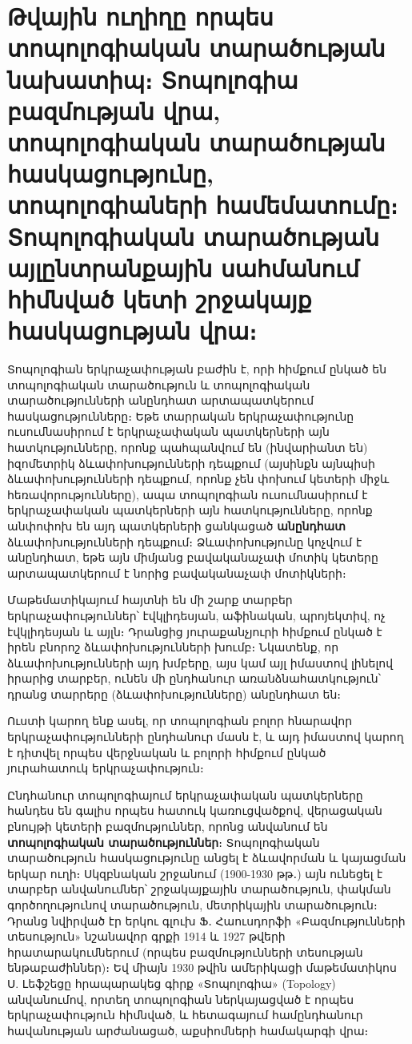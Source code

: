\documentclass[./main.tex]{subfiles}
\begin{document}
\onehalfspacing

\section{Թվային ուղիղը որպես տոպոլոգիական տարածության նախատիպ։ Տո\-պոլոգիա բազմության վրա, տոպոլոգիական տարածության հասկացությունը, տոպոլոգիաների համեմատումը։ Տոպոլոգիական տարածության այլընտրան\-քա\-յին սահ\-մանում հիմնված կետի շրջակայք հասկացության վրա։}\label{sec:4}

\par Տոպոլոգիան երկրաչափության բաժին է, որի հիմքում ընկած են տոպոլոգիա\-կան տարածություն և տոպոլոգիական տարածությունների անընդհատ արտա\-պատ\-կե\-րում հասկացությունները։ Եթե տարրական երկրաչափությունը ուսումնասիրում է երկ\-րա\-չա\-փական պատկերների այն հատկությունները, որոնք պահպանվում են \linebreak (ին\-վարիանտ են) իզոմետրիկ  ձևափոխությունների դեպքում (այսինքն այնպիսի ձևափոխությունների դեպքում, որոնք չեն փոխում կետերի միջև հեռավորություն\-նե\-րը), ապա տոպոլոգիան ուսումնասիրում է երկրաչափական պատկերների այն հատ\-կու\-թյունները, որոնք անփոփոխ են այդ պատկերների ցանկացած \textbf{անընդհատ} ձևափո\-խու\-թյունների դեպքում։ Ձևափոխությունը կոչվում է անընդհատ, եթե այն միմյանց բավականա\-չափ մոտիկ կետերը արտապատկերում է նորից բավականա\-չափ մոտիկների։

\par Մաթեմատիկայում հայտնի են մի շարք տարբեր երկրաչափություններ՝ էվկ\-լի\-դեսյան, աֆինական, պրոյեկտիվ, ոչ էվկլիդեսյան և այլն։ Դրանցից յուրաքանչյուրի հիմքում ընկած է իրեն բնորոշ ձևափոխությունների խումբ։ Նկատենք, որ ձևափո\-խու\-թյունների այդ խմբերը, այս կամ այլ իմաստով լինելով իրարից տարբեր, ունեն մի ընդհանուր առանձնահատկություն՝ դրանց տար\-րերը (ձևափոխութ\-յունները) \linebreak անընդհատ են։

\par Ուստի կարող ենք ասել, որ տոպոլոգիան բոլոր հնարավոր երկրաչափու\-թյուն\-ների ընդհանուր մասն է, և այդ իմաստով կարող է դիտվել որպես վերջնական և բոլորի հիմքում ընկած յուրահատուկ երկրաչափություն։

\par Ընդհանուր տոպոլոգիայում երկրաչափական պատկերները հանդես են գալիս որ\-պես հատուկ կառուցվածքով, վերացական բնույթի կետերի բազմություններ, \linebreak  որոնց անվանում են \textbf{տոպոլոգիական տարածություններ}։ Տոպոլոգիական տարա\-ծու\-թյուն հասկա\-ցու\-թյունը անցել է ձևավորման և կայացման երկար ուղի։ Սկզբնա\-կան շրջանում (1900-1930 թթ․) այն ունեցել է տարբեր անվանումներ՝ շրջակայքային տարածություն, փակման գործողութ\-յունով տարածություն, մետրիկային տարա\-ծու\-թյուն։ Դրանց նվիրված էր երկու գլուխ Ֆ․ Հաուսդորֆի «Բազմությունների տեսու\-թյուն» նշանա\-վոր գրքի 1914 և 1927 թվերի հրատարակումներում (որպես բազմու\-թյունների տեսու\-թյան ենթաբաժիններ)։ Եվ միայն 1930 թվին ամերիկացի մաթեմա\-տիկոս Ս. Լեֆշեցը հրապարակեց գիրք «Տոպոլոգիա» (Topology) անվանումով, որտեղ տոպոլոգիան ներկայացված է որպես երկրաչա\-փություն հիմնված, և հետա\-գայում համընդհանուր հավանության արժանացած, աքսիոմների համակարգի վրա։
\end{document}
